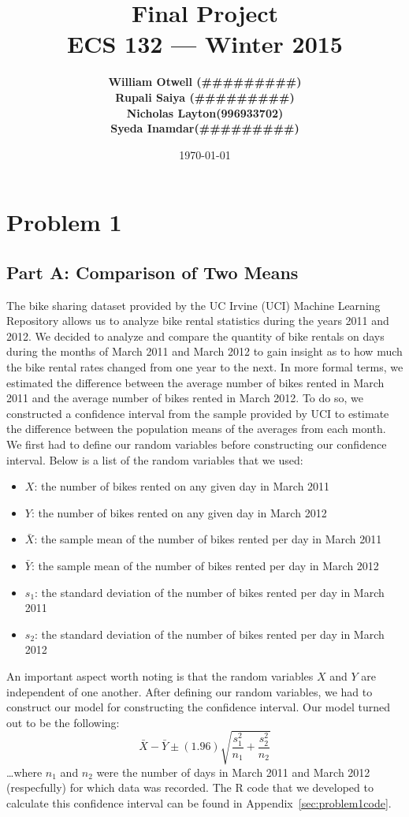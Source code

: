 \documentclass[11pt]{article}
\title{\vspace{-3ex}\bf Final Project\\[2ex] 
       \normalsize ECS 132 --- Winter 2015}
\date{\today}
\author{\bf William Otwell (\#\#\#\#\#\#\#\#\#)\\ \bf Rupali Saiya (\#\#\#\#\#\#\#\#\#)\\ \bf Nicholas Layton(996933702)\\ \bf Syeda Inamdar(\#\#\#\#\#\#\#\#\#)\\}
\begin{document}
\maketitle
\pagebreak
\tableofcontents
\pagebreak

\section{Problem 1}
\label{sec:problem1}
\subsection{Part A: Comparison of Two Means}
\label{subsec:1a}
The bike sharing dataset provided by the UC Irvine (UCI) Machine Learning Repository allows us to analyze bike rental statistics during the years 2011 and 2012. We decided to analyze and compare the quantity of bike rentals on days during the months of March 2011 and March 2012 to gain insight as to how much the bike rental rates changed from one year to the next. In more formal terms, we estimated the difference between the average number of bikes rented in March 2011 and the average number of bikes rented in March 2012. To do so, we constructed a confidence interval from the sample provided by UCI to estimate the difference between the population means of the averages from each month. We first had to define our random variables before constructing our confidence interval. Below is a list of the random variables that we used:
\begin{itemize}
	\item $X$: the number of bikes rented on any given day in March 2011
	\item $Y$: the number of bikes rented on any given day in March 2012
	\item $\bar{X}$: the sample mean of the number of bikes rented per day in March 2011
	\item $\bar{Y}$: the sample mean of the number of bikes rented per day in March 2012
	\item $s_1$: the standard deviation of the number of bikes rented per day in March 2011
	\item $s_2$: the standard deviation of the number of bikes rented per day in March 2012
\end{itemize}
An important aspect worth noting is that the random variables $X$ and $Y$ are independent of one another. After defining our random variables, we had to construct our model for constructing the confidence interval. Our model turned out to be the following:
\begin{equation}
\bar{X} - \bar{Y} \pm (1.96) \sqrt{\frac{s_{1}^{2}}{n_1} + \frac{s_{2}^{2}}{n_2}}
\end{equation}
\dots where $n_1$ and $n_2$ were the number of days in March 2011 and March 2012 (respecfully) for which data was recorded. The R code that we developed to calculate this confidence interval can be found in Appendix~\ref{sec:problem1code}.
\end{document}
